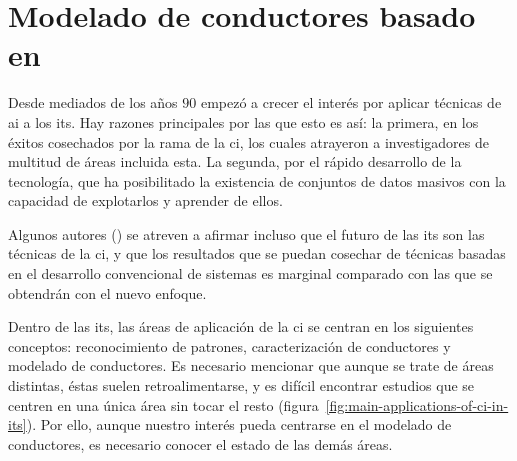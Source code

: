 \section{Modelado de conductores basado en }

Desde mediados de los años $90$ empezó a crecer el interés por aplicar técnicas de \gls{ai} a los \gls{its}. Hay razones principales por las que esto es así: la primera, en los éxitos cosechados por la rama de la \gls{ci}, los cuales atrayeron a investigadores de multitud de áreas incluida esta. La segunda, por el rápido desarrollo de la tecnología, que ha posibilitado la existencia de conjuntos de datos masivos con la capacidad de explotarlos y aprender de ellos.

Algunos autores (\cite{Zhang2011}) se atreven a afirmar incluso que el futuro de las \gls{its} son las técnicas de la \gls{ci}, y que los resultados que se puedan cosechar de técnicas basadas en el desarrollo convencional de sistemas es marginal comparado con las que se obtendrán con el nuevo enfoque.

Dentro de las \gls{its}, las áreas de aplicación de la \gls{ci} se centran en los siguientes conceptos: reconocimiento de patrones, caracterización de conductores y modelado de conductores. Es necesario mencionar que aunque se trate de áreas distintas, éstas suelen retroalimentarse, y es difícil encontrar estudios que se centren en una única área sin tocar el resto (figura~\ref{fig:main-applications-of-ci-in-its}). Por ello, aunque nuestro interés pueda centrarse en el modelado de conductores, es necesario conocer el estado de las demás áreas.

